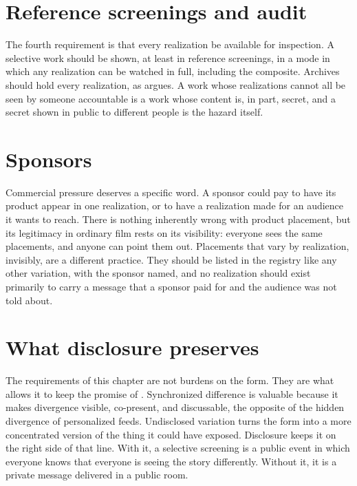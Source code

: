 \section{Reference screenings and audit}

The fourth requirement is that every realization be available for inspection. A selective work should be shown, at least in reference screenings, in a mode in which any realization can be watched in full, including the composite. Archives should hold every realization, as  argues. A work whose realizations cannot all be seen by someone accountable is a work whose content is, in part, secret, and a secret shown in public to different people is the hazard itself.

\section{Sponsors}

Commercial pressure deserves a specific word. A sponsor could pay to have its product appear in one realization, or to have a realization made for an audience it wants to reach. There is nothing inherently wrong with product placement, but its legitimacy in ordinary film rests on its visibility: everyone sees the same placements, and anyone can point them out. Placements that vary by realization, invisibly, are a different practice. They should be listed in the registry like any other variation, with the sponsor named, and no realization should exist primarily to carry a message that a sponsor paid for and the audience was not told about.

\section{What disclosure preserves}

The requirements of this chapter are not burdens on the form. They are what allows it to keep the promise of . Synchronized difference is valuable because it makes divergence visible, co-present, and discussable, the opposite of the hidden divergence of personalized feeds. Undisclosed variation turns the form into a more concentrated version of the thing it could have exposed. Disclosure keeps it on the right side of that line. With it, a selective screening is a public event in which everyone knows that everyone is seeing the story differently. Without it, it is a private message delivered in a public room.
